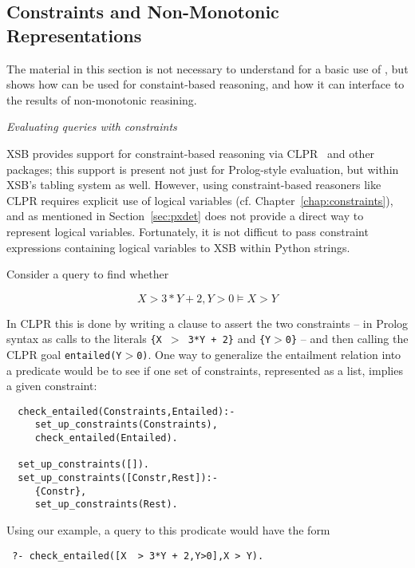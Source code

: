 \subsection{Constraints and Non-Monotonic Representations} 

The material in this section is not necessary to understand for a
basic use of \px{}, but shows how \px{} can be used for
constaint-based reasoning, and how it can interface to the results of
non-monotonic reasining.

\begin{example} \rm {\it Evaluating queries with constraints} \label{ex:connstraints}

  XSB provides support for constraint-based reasoning via
  CLPR~\cite{Holz95} and other packages; this support is present not
  just for Prolog-style evaluation, but within XSB's tabling system as
  well.  However, using constraint-based reasoners like CLPR requires
  explicit use of logical variables
  (cf. Chapter~\ref{chap:constraints}), and as mentioned in
  Section~\ref{sec:pxdet} \px{} does not provide a direct way to
  represent logical variables.  Fortunately, it is not difficut to
  pass constraint expressions containing logical variables to XSB
  within Python strings.

  Consider a query to find whether 

  \[X  > 3*Y + 2,Y>0 \models X > Y\]

\noindent  
  In CLPR this is done by writing a clause to assert the two
  constraints -- in Prolog syntax as calls to the literals {\tt \{X
    $>$ 3*Y + 2\}} and {\tt \{Y$>$0\}} -- and then calling the CLPR
  goal {\tt entailed(Y$>$0)}.  One way to generalize the entailment
  relation into a predicate would be to see if one set of constraints,
  represented as a list, implies a given constraint:

{\small  
\begin{verbatim}  
  check_entailed(Constraints,Entailed):- 
     set_up_constraints(Constraints),
     check_entailed(Entailed).

  set_up_constraints([]).
  set_up_constraints([Constr,Rest]):- 
     {Constr},
     set_up_constraints(Rest).
\end{verbatim}
}
Using our example, a query to this prodicate would have the form

\begin{verbatim}
 ?- check_entailed([X  > 3*Y + 2,Y>0],X > Y).
\end{verbatim}


\end{example}
